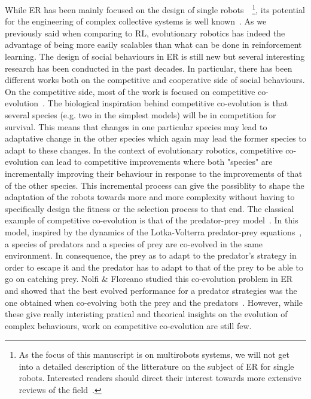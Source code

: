     While ER has been mainly focused on the design of single robots~\cite{Doncieux2015a}~\footnote{As the focus of this manuscript is on multirobots systems, we will not get into a detailed description of the litterature on the subject of ER for single robots. Interested readers should direct their interest towards more extensive reviews of the field~\cite{Floreano2008, Bongard2013a, Trianni2014, Doncieux2015a}.}, its potential for the engineering of complex collective systems is well known~\cite{Baldassarre2003}. As we previously said when comparing to RL, evolutionary robotics has indeed the advantage of being more easily scalables than what can be done in reinforcement learning. The design of social behaviours in ER is still new but several interesting research has been conducted in the past decades. In particular, there has been different works both on the competitive and cooperative side of social behaviours. On the competitive side, most of the work is focused on competitive co-evolution~\cite{Floreano1998, Floreano2008}. The biological inspiration behind competitive co-evolution is that several species (e.g. two in the simplest models) will be in competition for survival. This means that changes in one particular species may lead to adaptative change in the other species which again may lead the former species to adapt to these changes. In the context of evolutionary robotics, competitive co-evolution can lead to competitive improvements where both "species" are incrementally improving their behaviour in response to the improvements of that of the other species. This incremental process can give the possiblity to shape the adaptation of the robots towards more and more complexity without having to specifically design the fitness or the selection process to that end. The classical example of competitive co-evolution is that of the predator-prey model~\cite{Floreano1997}. In this model, inspired by the dynamics of the Lotka-Volterra predator-prey equations~\cite{Yorke1973}, a species of predators and a species of prey are co-evolved in the same environment. In consequence, the prey as to adapt to the predator's strategy in order to escape it and the predator has to adapt to that of the prey to be able to go on catching prey. Nolfi & Floreano studied this co-evolution problem in ER and showed that the best evolved performance for a predator strategies was the one obtained when co-evolving both the prey and the predators~\cite{Nolfi1998}. However, while these give really interisting pratical and theorical insights on the evolution of complex behaviours, work on competitive co-evolution are still few.

